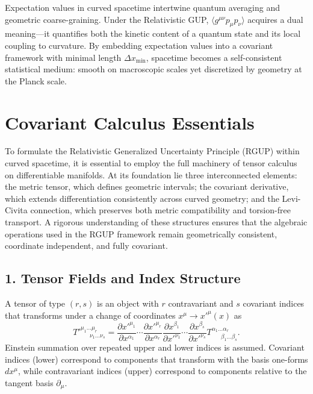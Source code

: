 \documentclass[11pt,oneside]{book}
\newenvironment{booknote}{
  \begin{tcolorbox}[
    colback=gray!3!white,
    colframe=gray!45!black,
    fonttitle=\bfseries,
    title=\textbf{Book Note},
  ]
}{\end{tcolorbox}}
\numberwithin{equation}{chapter}
\begin{document}
\begin{booknote}
Expectation values in curved spacetime intertwine quantum averaging and geometric coarse-graining.  
Under the Relativistic GUP, $\langle g^{\mu\nu}p_\mu p_\nu\rangle$ acquires a dual meaning—it quantifies both the kinetic content of a quantum state and its local coupling to curvature.  
By embedding expectation values into a covariant framework with minimal length $\Delta x_{\min}$, spacetime becomes a self-consistent statistical medium: smooth on macroscopic scales yet discretized by geometry at the Planck scale.
\end{booknote}
\clearpage
\section{Covariant Calculus Essentials}

To formulate the Relativistic Generalized Uncertainty Principle (RGUP) within curved spacetime, it is essential to employ the full machinery of tensor calculus on differentiable manifolds.  
At its foundation lie three interconnected elements: the metric tensor, which defines geometric intervals; the covariant derivative, which extends differentiation consistently across curved geometry; and the Levi-Civita connection, which preserves both metric compatibility and torsion-free transport.  
A rigorous understanding of these structures ensures that the algebraic operations used in the RGUP framework remain geometrically consistent, coordinate independent, and fully covariant.


\subsection*{1. Tensor Fields and Index Structure}

A tensor of type $(r,s)$ is an object with $r$ contravariant and $s$ covariant indices that transforms under a change of coordinates $x^\mu \rightarrow x'^{\mu}(x)$ as
\begin{equation}
T'^{\mu_1\ldots \mu_r}_{\ \ \ \ \ \ \ \nu_1\ldots\nu_s}
= 
\frac{\partial x'^{\mu_1}}{\partial x^{\alpha_1}}\!\cdots\!
\frac{\partial x'^{\mu_r}}{\partial x^{\alpha_r}}
\frac{\partial x^{\beta_1}}{\partial x'^{\nu_1}}\!\cdots\!
\frac{\partial x^{\beta_s}}{\partial x'^{\nu_s}}
T^{\alpha_1\ldots \alpha_r}_{\ \ \ \ \ \ \ \beta_1\ldots\beta_s}.
\end{equation}
Einstein summation over repeated upper and lower indices is assumed.  
Covariant indices (lower) correspond to components that transform with the basis one-forms $dx^\mu$, while contravariant indices (upper) correspond to components relative to the tangent basis $\partial_\mu$.
\end{document}

